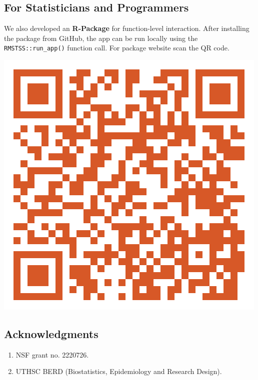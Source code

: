 \documentclass[a0,landscape]{a0poster}
\begin{document}
\begin{minipage}[t]{0.5\linewidth}
    \subsection*{\Large For Statisticians and Programmers}
    \Large We also developed an \textbf{R-Package} for function-level interaction. After installing the package from GitHub, the app can be run locally using the \verb|RMSTSS::run_app()| function call. For package website scan the QR code.
\end{minipage}
\hfill
\begin{minipage}[c]{0.1\linewidth}
    \centering
    \includegraphics[height=\linewidth, width=\linewidth]{images/package-qr-code.png}
\end{minipage}
\hfill
\begin{minipage}[t]{0.3\linewidth}
    \subsection*{\Large Acknowledgments}
    \begin{enumerate}
        \item \Large NSF grant no. 2220726.
        \item \Large UTHSC BERD (Biostatistics, Epidemiology and Research Design).
    \end{enumerate}
\end{minipage}
\end{document}
